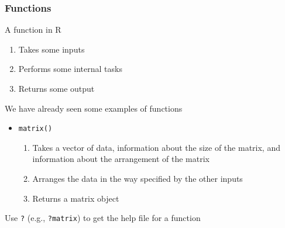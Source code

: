 \documentclass{beamer}\usepackage[]{graphicx}\usepackage[]{xcolor}
\begin{document}
\begin{frame}\frametitle{Functions}
    A function in R
    \begin{enumerate}
        \item Takes some inputs
        \item Performs some internal tasks
        \item Returns some output
    \end{enumerate}
    \vspace{2ex}
    We have already seen some examples of functions
    \begin{itemize}
        \item \texttt{matrix()}
        \begin{enumerate}
            \item Takes a vector of data, information about the size of the matrix, and information about the arrangement of the matrix
            \item Arranges the data in the way specified by the other inputs
            \item Returns a matrix object
        \end{enumerate}
    \end{itemize}
    \vspace{2ex}
    Use \texttt{?} (e.g., \texttt{?matrix}) to get the help file for a function
\end{frame}
\end{document}
